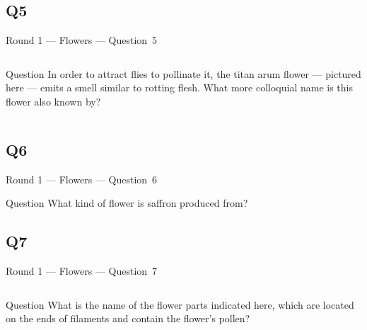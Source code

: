 \documentclass[11pt]{beamer}
\begin{document}
\subsection*{Q5}
\begin{frame}[t]{Round 1 --- Flowers --- \mbox{Question 5}}
\vspace{-0.5em}
\begin{columns}[T,totalwidth=\linewidth]
\begin{column}{0.32\linewidth}
\begin{block}{Question}
In order to attract flies to pollinate it, the titan arum flower --- pictured here --- emits a smell similar to rotting flesh. What more colloquial name is this flower also known by?
\end{block}
\end{column}
\begin{column}{0.65\linewidth}
\begin{center}
\texttt{[image: \{Images/corpse]}.jpg}
\end{center}
\end{column}
\end{columns}
\end{frame}
\subsection*{Q6}
\begin{frame}[t]{Round 1 --- Flowers --- \mbox{Question 6}}
\vspace{-0.5em}
\begin{block}{Question}
What kind of flower is saffron produced from?
\end{block}
\end{frame}
\subsection*{Q7}
\begin{frame}[t]{Round 1 --- Flowers --- \mbox{Question 7}}
\vspace{-0.5em}
\begin{columns}[T,totalwidth=\linewidth]
\begin{column}{0.32\linewidth}
\begin{block}{Question}
What is the name of the flower parts indicated here, which are located on the ends of filaments and contain the flower's pollen?
\end{block}
\end{column}
\begin{column}{0.65\linewidth}
\begin{center}
\texttt{[image: \{Images/anther]}.jpg}
\end{center}
\end{column}
\end{columns}
\end{frame}
\end{document}
